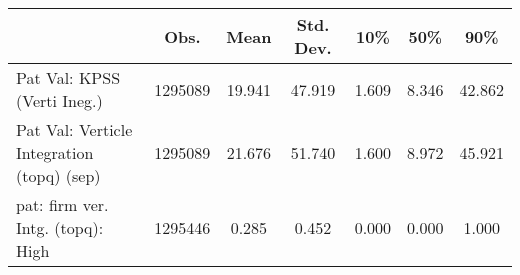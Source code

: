 {
\def\sym#1{\ifmmode^{#1}\else\(^{#1}\)\fi}
\begin{tabular}{l*{1}{cccccc}}
\hline\hline
                    &        Obs.&        Mean&   Std. Dev.&        10\%&        50\%&        90\%\\
\hline
Pat Val: KPSS (Verti Ineg.)&     1295089&      19.941&      47.919&       1.609&       8.346&      42.862\\
Pat Val: Verticle Integration (topq) (sep)&     1295089&      21.676&      51.740&       1.600&       8.972&      45.921\\
pat: firm ver. Intg. (topq): High&     1295446&       0.285&       0.452&       0.000&       0.000&       1.000\\
\hline\hline
\end{tabular}
}
